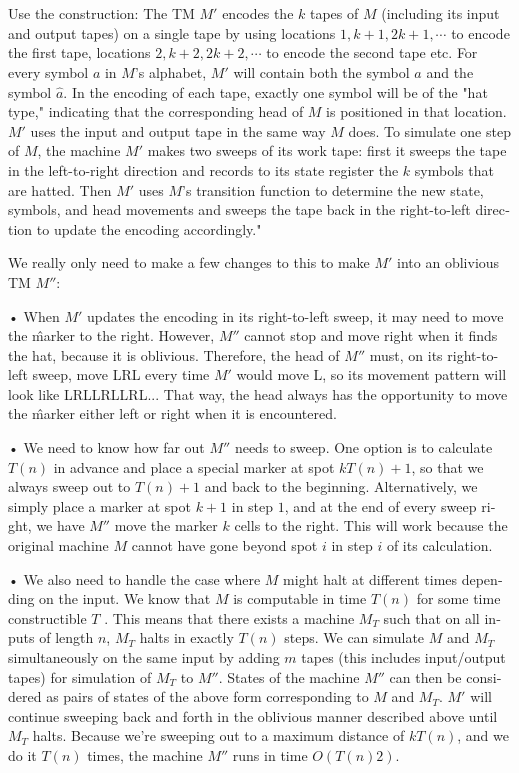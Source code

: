 \documentclass{article}
\begin{document}
\section{}
\begin{latin}
Use the construction: The TM $M'$ encodes the $k$ tapes of $M$ (including its input and output tapes) on a single tape by using locations $1, k + 1, 2k + 1, \cdots$ to encode the first tape, locations $2, k + 2, 2k + 2, \cdots$ to encode the second tape etc. For every symbol $a$ in $M$’s alphabet, $M'$ will contain both the symbol $a$ and the symbol $\hat{a}$. In the encoding of each tape, exactly one symbol will be of the "hat type," indicating that the corresponding head of $M$ is positioned in that location. $M'$ uses the input and output tape in the same way $M$ does. To simulate one step of $M$, the machine $M'$ makes two sweeps of its work tape: first it sweeps
the tape in the left-to-right direction and records to its state register the $k$
symbols that are hatted. Then $M'$ uses $M$’s transition function to determine
the new state, symbols, and head movements and sweeps the tape back in
the right-to-left direction to update the encoding accordingly."

We really only need to make a few changes to this to make $M'$ into an
oblivious TM $M''$:

• When $M'$ updates the encoding in its right-to-left sweep, it may need
to move the \^ marker to the right. However, $M''$ cannot stop and move
right when it finds the hat, because it is oblivious. Therefore, the head
of $M''$ must, on its right-to-left sweep, move LRL every time $M'$ would
move L, so its movement pattern will look like LRLLRLLRL... That
way, the head always has the opportunity to move the \^ marker either
left or right when it is encountered.

• We need to know how far out $M''$ needs to sweep. One option is to
calculate $T(n)$ in advance and place a special marker at spot $kT(n)+1$,
so that we always sweep out to $T (n) + 1$ and back to the beginning.
Alternatively, we simply place a marker at spot $k + 1$ in step $1$, and at
the end of every sweep right, we have $M''$ move the marker $k$ cells to
the right. This will work because the original machine $M$ cannot have
gone beyond spot $i$ in step $i$ of its calculation.

• We also need to handle the case where $M$ might halt at different times
depending on the input. We know that $M$ is computable in time $T (n)$
for some time constructible $T$ . This means that there exists a machine
$M_T$ such that on all inputs of length $n$, $M_T$ halts in exactly $T (n)$
steps. We can simulate $M$ and $M_T$ simultaneously on the same input
by adding $m$ tapes (this includes input/output tapes) for simulation
of $M_T$ to $M''$. States of the machine $M''$ can then be considered as
pairs of states of the above form corresponding to $M$ and $M_T$. $M'$ will
continue sweeping back and forth in the oblivious manner described
above until $M_T$ halts.
Because we’re sweeping out to a maximum distance of $kT (n)$, and we do
it $T (n)$ times, the machine $M''$ runs in time $O(T (n)2)$.
\end{latin}
\end{document}
